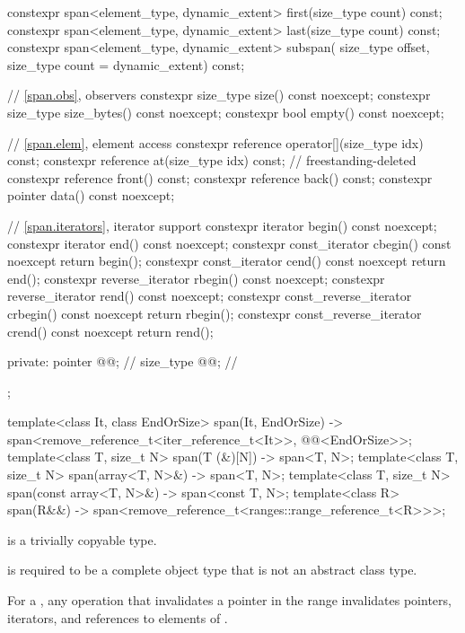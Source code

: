 \begin{codeblock}
{{    constexpr span<element_type, dynamic_extent> first(size_type count) const;
    constexpr span<element_type, dynamic_extent> last(size_type count) const;
    constexpr span<element_type, dynamic_extent> subspan(
      size_type offset, size_type count = dynamic_extent) const;

    // \ref{span.obs}, observers
    constexpr size_type size() const noexcept;
    constexpr size_type size_bytes() const noexcept;
    constexpr bool empty() const noexcept;

    // \ref{span.elem}, element access
    constexpr reference operator[](size_type idx) const;
    constexpr reference at(size_type idx) const;                            // freestanding-deleted
    constexpr reference front() const;
    constexpr reference back() const;
    constexpr pointer data() const noexcept;

    // \ref{span.iterators}, iterator support
    constexpr iterator begin() const noexcept;
    constexpr iterator end() const noexcept;
    constexpr const_iterator cbegin() const noexcept { return begin(); }
    constexpr const_iterator cend() const noexcept { return end(); }
    constexpr reverse_iterator rbegin() const noexcept;
    constexpr reverse_iterator rend() const noexcept;
    constexpr const_reverse_iterator crbegin() const noexcept { return rbegin(); }
    constexpr const_reverse_iterator crend() const noexcept { return rend(); }

  private:
    pointer @@;              // \expos
    size_type @@;            // \expos
  };

  template<class It, class EndOrSize>
    span(It, EndOrSize) -> span<remove_reference_t<iter_reference_t<It>>,
                                @@<EndOrSize>>;
  template<class T, size_t N>
    span(T (&)[N]) -> span<T, N>;
  template<class T, size_t N>
    span(array<T, N>&) -> span<T, N>;
  template<class T, size_t N>
    span(const array<T, N>&) -> span<const T, N>;
  template<class R>
    span(R&&) -> span<remove_reference_t<ranges::range_reference_t<R>>>;
}
\end{codeblock}

\pnum
{} is
a trivially copyable type.

\pnum
{} is required to be
a complete object type that is not an abstract class type.

\pnum
For a  ,
any operation that invalidates a pointer in
the range 
invalidates pointers, iterators, and references to elements of .


